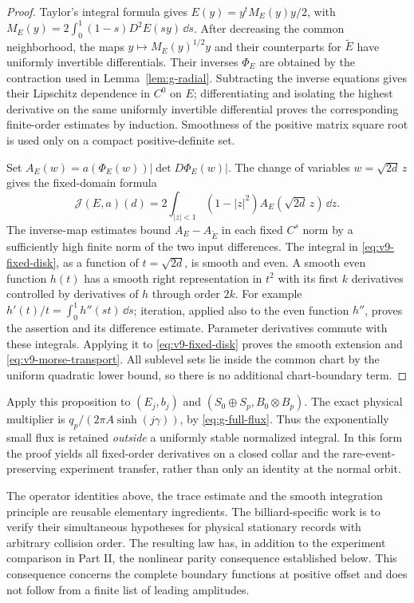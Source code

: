 \begin{proof}
Taylor's integral formula gives $E(y)=y^tM_E(y)y/2$, with
$M_E(y)=2\int_0^1(1-s)D^2E(sy)\,\dd s$.
After decreasing the common neighborhood, the maps
$y\mapsto M_E(y)^{1/2}y$ and their counterparts for $\widetilde E$
have uniformly invertible differentials. Their inverses $\Phi_E$
are obtained by the contraction used in Lemma~\ref{lem:g-radial}.
Subtracting the inverse equations gives their Lipschitz dependence
in $C^0$ on $E$; differentiating and isolating the highest derivative
on the same uniformly invertible differential proves the corresponding
finite-order estimates by induction. Smoothness of the positive matrix
square root is used only on a compact positive-definite set.

Set $A_E(w)=a(\Phi_E(w))|\det D\Phi_E(w)|$. The change of variables
$w=\sqrt{2d}\,z$ gives the fixed-domain formula
\begin{equation}\label{eq:v9-fixed-disk}
 \mathcal J(E,a)(d)=
          2\int_{|z|<1}(1-|z|^2)A_E(\sqrt{2d}\,z)\,\dd z.
\end{equation}
The inverse-map estimates bound $A_E-A_{\widetilde E}$ in each fixed
$C^s$ norm by a sufficiently high finite norm of the two input
differences. The integral in \eqref{eq:v9-fixed-disk}, as a function
of $t=\sqrt{2d}$, is smooth and even. A smooth even function $h(t)$
has a smooth right representation in $t^2$ with its first $k$
derivatives controlled by derivatives of $h$ through order $2k$.
For example $h'(t)/t=\int_0^1h''(st)\,\dd s$; iteration, applied
also to the even function $h''$, proves the assertion and its
difference estimate. Parameter derivatives commute with these
integrals. Applying it to \eqref{eq:v9-fixed-disk} proves the smooth
extension and \eqref{eq:v9-morse-transport}. All sublevel sets lie
inside the common chart by the uniform quadratic lower bound, so
there is no additional chart-boundary term.
\end{proof}

Apply this proposition to $(E_j,b_j)$ and
$(S_0\oplus S_p,B_0\otimes B_p)$. The exact physical multiplier is
$q_p/(2\pi A\sinh(j\gamma))$, by
\eqref{eq:g-full-flux}. Thus the exponentially small flux is retained
\emph{outside} a uniformly stable normalized integral. In this form
the proof yields all fixed-order derivatives on a closed collar and
the rare-event-preserving experiment transfer, rather than only an
identity at the normal orbit.

The operator identities above, the trace estimate and the smooth
integration principle are reusable elementary ingredients. The
billiard-specific work is to verify their simultaneous hypotheses for
physical stationary records with arbitrary collision order. The
resulting law has, in addition to the experiment comparison in Part II,
the nonlinear parity consequence established below. This
consequence concerns the complete boundary functions at positive
offset and does not follow from a finite list of leading amplitudes.
